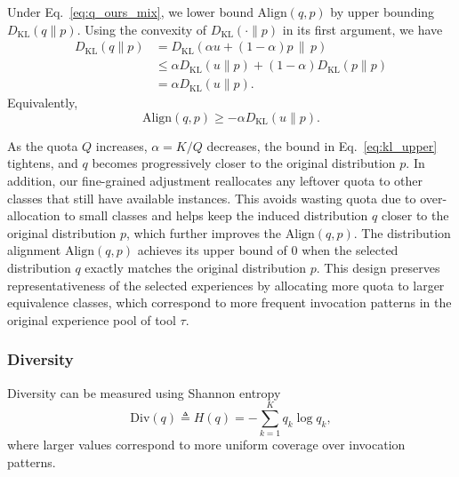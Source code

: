 \documentclass[11pt]{article}
\begin{document}
Under Eq.~\eqref{eq:q_ours_mix}, we lower bound $\text{Align}(q,p)$ by upper bounding $D_{\mathrm{KL}}(q\|p)$.
Using the convexity of $D_{\mathrm{KL}}(\cdot\|p)$ in its first argument, we have
\begin{align}
D_{\mathrm{KL}}(q\|p)
&= D_{\mathrm{KL}}\!\left(\alpha u + (1-\alpha)p \,\middle\|\, p\right) \nonumber\\
&\le \alpha D_{\mathrm{KL}}(u\|p) + (1-\alpha)D_{\mathrm{KL}}(p\|p) \nonumber\\
&= \alpha D_{\mathrm{KL}}(u\|p). \label{eq:kl_upper}
\end{align}
Equivalently,
\begin{equation}
\label{eq:align_lower}
\text{Align}(q,p) \ge -\alpha D_{\mathrm{KL}}(u\|p).
\end{equation}

As the quota $Q$ increases, $\alpha=K/Q$ decreases, the bound in Eq.~\eqref{eq:kl_upper} tightens, and $q$ becomes progressively closer to the original distribution $p$. 
In addition, our fine-grained adjustment reallocates any leftover quota to other classes that still have available instances. 
This avoids wasting quota due to over-allocation to small classes and helps keep the induced distribution $q$ closer to the original distribution $p$, which further improves the $\text{Align}(q,p)$. The distribution alignment $\text{Align}(q,p)$ achieves its upper bound of $0$ when the selected distribution $q$ exactly matches the original distribution $p$. 
This design preserves representativeness of the selected experiences by allocating more quota to larger equivalence classes, which correspond to more frequent invocation patterns in the original experience pool of tool $\tau$.


\subsubsection{Diversity}
Diversity can be measured using Shannon entropy~\cite{entropy}
\begin{equation}
\text{Div}(q)\triangleq H(q)
= -\sum_{k=1}^{K} q_k \log q_k,
\end{equation}
where larger values correspond to more uniform coverage over invocation patterns. 
\end{document}
